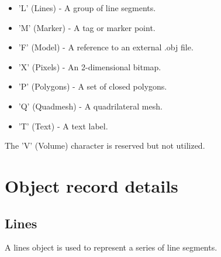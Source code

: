 \documentclass{article}
\begin{document}
\begin{itemize}
\item 'L' (Lines) - A group of line segments.

\item 'M' (Marker) - A tag or marker point.

\item 'F' (Model) - A reference to an external .obj file.

\item 'X' (Pixels) - An 2-dimensional bitmap.

\item 'P' (Polygons) - A set of closed polygons.

\item 'Q' (Quadmesh) - A quadrilateral mesh.

\item 'T' (Text) - A text label.

\end{itemize}

The 'V' (Volume) character is reserved but not utilized.

\section{Object record details}

\subsection{Lines}

A lines object is used to represent a series of line segments.
\end{document}
